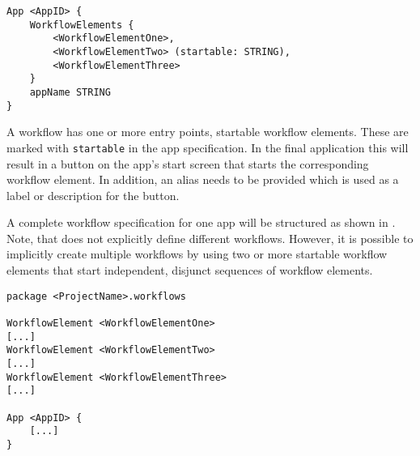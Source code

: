 \begin{lstlisting}[language=MD2, label=lst:app, caption=App definition in \MD]
App <AppID> {
	WorkflowElements {
		<WorkflowElementOne>,
		<WorkflowElementTwo> (startable: STRING),
		<WorkflowElementThree> 
	}
	appName STRING
}
\end{lstlisting}

A workflow has one or more entry points, \ie startable workflow elements. These are marked with {\lstinline!startable!} in the app specification.
In the final application this will result in a button on the app's start screen that starts the corresponding workflow element. In addition, an alias needs to be provided which is used as a label or description for the button.

A complete workflow specification for one app will be structured as shown in . Note, that \MD does not explicitly define different workflows. However, it is possible to implicitly create multiple workflows by using two or more startable workflow elements that start independent, disjunct sequences of workflow elements.

\begin{lstlisting}[language=MD2, label=lst:workflow, caption=Workflow definition in \MD]
package <ProjectName>.workflows

WorkflowElement <WorkflowElementOne>
[...]
WorkflowElement <WorkflowElementTwo>
[...]
WorkflowElement <WorkflowElementThree>
[...]

App <AppID> {
	[...]
}
\end{lstlisting}